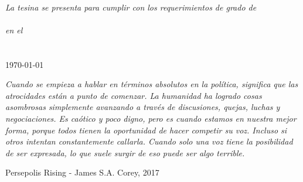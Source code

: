 \documentclass[notitlepage]{report}
\newcommand\blankpage{
	\null
	\thispagestyle{empty}
	\addtocounter{page}{0}
	\newpage}
\begin{document}
\begin{titlepage}
\begin{center}
\begin{minipage}[t]{0.4\textwidth}
\begin{flushright}
				\cosupname
			\end{flushright}
		\end{minipage}\\[2cm]
		\vfill
		\large \textit{La tesina se presenta para cumplir con los requerimientos de grado de \\ \gradon}\\[0.3cm] %
		\textit{en el}\\[0.4cm]
		{\color{ideicolor} \grupon \\ \LARGE \instn}\\[1cm] %
		\vfill
		{\large \today}\\[4cm] %
		
		\vfill
	\end{center}
\end{titlepage}


\vspace*{0.1\textheight}

{\itshape Cuando se empieza a hablar en términos absolutos en la política, significa que las atrocidades están a punto de comenzar. La humanidad ha logrado cosas asombrosas simplemente avanzando a través de discusiones, quejas, luchas y negociaciones. Es caótico y poco digno, pero es cuando estamos en nuestra mejor forma, porque todos tienen la oportunidad de hacer competir su voz. Incluso si otros intentan constantemente callarla. Cuando solo una voz tiene la posibilidad de ser expresada, lo que suele surgir de eso puede ser algo terrible. }\bigbreak

\hfill Persepolis Rising - James S.A. Corey, 2017

\afterpage{\blankpage}
\clearpage

\begin{abstract} 
	
\end{abstract}

\afterpage{\blankpage}
\clearpage
\end{document}
